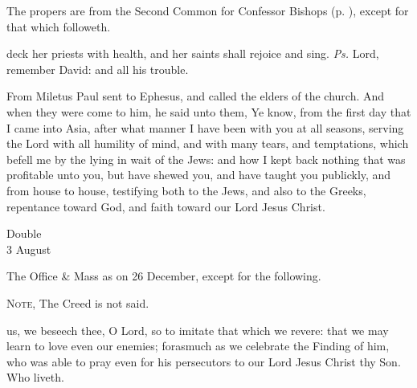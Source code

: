\begin{rubric}
	The propers are from the Second Common for Confessor Bishops (p. \pageref{CommonConfessorBishopII}), except for that which followeth.
\end{rubric}

\introit
{} deck her priests with health, and her saints shall rejoice and sing. \textit{Ps.} Lord, remember David: and all his trouble.

 From Miletus Paul sent to Ephesus, and called the elders of the church. And when they were come to him, he said unto them, Ye know, from the first day that I came into Asia, after what manner I have been with you at all seasons, serving the Lord with all humility of mind, and with many tears, and temptations, which befell me by the lying in wait of the Jews: and how I kept back nothing that was profitable unto you, but have shewed you, and have taught you publickly, and from house to house, testifying both to the Jews, and also to the Greeks, repentance toward God, and faith toward our Lord Jesus Christ.



\begin{inhead}
    {Double\\
3 August}
\end{inhead}
\begin{rubric}
	The Office \& Mass as on 26 December, except for the following.\par
	\textsc{Note,} The Creed is not said.
\end{rubric}
\collect
{} us, we beseech thee, O Lord, so to imitate that which we revere: that we may learn to love even our enemies; forasmuch as we celebrate the Finding of him, who was able to pray even for his persecutors to our Lord Jesus Christ thy Son. Who liveth.

